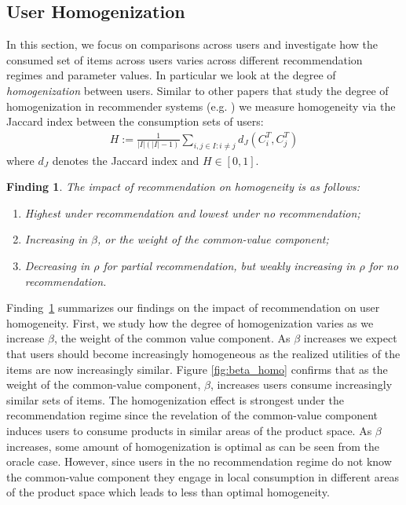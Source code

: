 \documentclass[format=acmsmall, review=false]{acmart}
\newtheorem{finding}{Finding}
\begin{document}
\subsection{User Homogenization}
In this section, we focus on comparisons across users and investigate how the consumed set of items across users varies across different recommendation regimes and parameter values. In particular we look at the degree of \textit{homogenization} between users. Similar to other papers that study the degree of homogenization in recommender systems (e.g. \cite{chaney2018algorithmic}) we measure homogeneity via the Jaccard index between the consumption sets of users:
\begin{align*}
H:=\frac{1}{|I|(|I|-1)}\sum_{i,j \in I: i \ne j}d_J(C_i^T,C_j^T)
\end{align*}
where $d_J$ denotes the Jaccard index and $H \in [0,1]$.
\begin{finding}\label{finding_homogeneity}
The impact of recommendation on homogeneity is as follows:
\begin{enumerate}
\item Highest under recommendation and lowest under no recommendation;
\item Increasing in $\beta$, or the weight of the common-value component;
\item Decreasing in $\rho$ for partial recommendation, but weakly increasing in $\rho$ for no recommendation.
\end{enumerate}
\end{finding}
Finding~\ref{finding_homogeneity} summarizes our findings on the impact of recommendation on user homogeneity. First, we study how the degree of homogenization varies as we increase $\beta$, the weight of the common value component. As $\beta$ increases we expect that users should become increasingly homogeneous as the realized utilities of the items are now increasingly similar. Figure \ref{fig:beta_homo} confirms that as the weight of the common-value component, $\beta$, increases users consume increasingly similar sets of items. The homogenization effect is strongest under the recommendation regime since the revelation of the common-value component induces users to consume products in similar areas of the product space. As $\beta$ increases, some amount of homogenization is optimal as can be seen from the oracle case. However, since users in the no recommendation regime do not know the common-value component they engage in local consumption in different areas of the product space which leads to less than optimal homogeneity.
\end{document}
